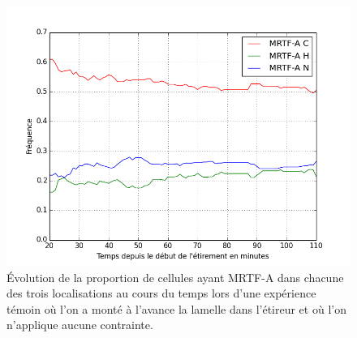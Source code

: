 \documentclass                                                                                                                                                                                                                                                                                                                                       {report}
\begin{document}
\begin{figure}[p]
\includegraphics[scale=0.4]{Figures/CHN_vs_Temps_reference.png} 
\caption{\label{Reference_dynamique} \'E{}volution de la proportion de cellules ayant MRTF-A dans chacune des trois localisations au cours du temps lors d'une expérience témoin où l'on a monté à l'avance la lamelle dans l'étireur et où l'on n'applique aucune contrainte.}
\end{figure}
\end{document}
